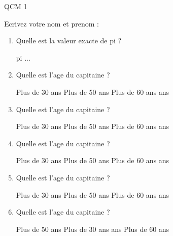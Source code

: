 \documentclass[a4paper, 11pt]{article}
\begin{document}
	\newenvironment{qcm} {} {}	
	QCM 1
	
	Ecrivez votre nom et prenom :
	\begin{qcm}
		\begin{enumerate}
			\item Quelle est la valeur exacte de pi ?
			\begin{tabenum} [1)]
				\tabenumitem pi
				...
			\end{tabenum}
		\vspace{5mm}

			\item Quelle est l'age du capitaine ?
			\begin{tabenum} [1)]
				\tabenumitem Plus de 30 ans
				\tabenumitem Plus de 50 ans
				\tabenumitem Plus de 60 ans
				 ans
			\end{tabenum}
		\vspace{5mm}

			\item Quelle est l'age du capitaine ?
			\begin{tabenum} [1)]
				\tabenumitem Plus de 30 ans
				\tabenumitem Plus de 50 ans
				\tabenumitem Plus de 60 ans
				 ans
			\end{tabenum}
		\vspace{5mm}

			\item Quelle est l'age du capitaine ?
			\begin{tabenum} [1)]
				\tabenumitem Plus de 30 ans
				\tabenumitem Plus de 50 ans
				\tabenumitem Plus de 60 ans
				 ans
			\end{tabenum}
		\vspace{5mm}

			\item Quelle est l'age du capitaine ?
			\begin{tabenum} [1)]
				\tabenumitem Plus de 30 ans
				\tabenumitem Plus de 50 ans
				\tabenumitem Plus de 60 ans
				 ans
			\end{tabenum}
		\vspace{5mm}

			\item Quelle est l'age du capitaine ?
			\begin{tabenum} [1)]
				\tabenumitem Plus de 50 ans
				\tabenumitem Plus de 30 ans
				 ans
				\tabenumitem Plus de 60 ans
			\end{tabenum}
		\vspace{5mm}

		\end{enumerate}
	\end{qcm}
	\newpage
	
\end{document}
